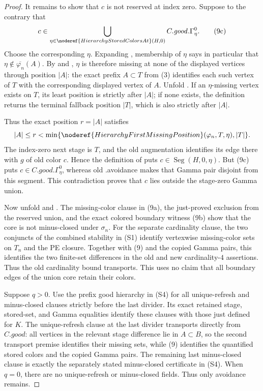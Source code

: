 \begin{proof}
It remains to show that \(c\) is not reserved at index zero.  Suppose to
the contrary that
\[
 c\in\bigcup_{\eta\in\noderef{HierarchyStoredColorsAt}(H,0)}
                  C.\mathit{good}.\Gamma^0_\eta .              \tag{9c}
\]
Choose the corresponding \(\eta\).  Expanding
, membership of \(\eta\) says in
particular that \(\eta\notin\overline{\varphi_n}(A)\).  By
 and , \(\eta\)
is therefore missing at none of the displayed vertices through position
\(|A|\): the exact prefix \(A\subset T\) from (3) identifies each such
vertex of \(T\) with the corresponding displayed vertex of \(A\).  Unfold
.  If an
\(\eta\)-missing vertex exists on \(T\), its least position is strictly
after \(|A|\); if none exists, the definition returns the terminal
fallback position \(|T|\), which is also strictly after \(|A|\).

Thus the exact position \(r=|A|\) satisfies
\[
 |A|\le r<\min\{
 \noderef{HierarchyFirstMissingPosition}(\varphi_n,T,\eta),|T|\}.
\]
The index-zero next stage is \(T\), and the old augmentation identifies
its edge there with \(g\) of old color \(c\).  Hence the definition of
 puts
\(c\in\operatorname{Seg}(H,0,\eta)\).  But (9c) puts
\(c\in C.\mathit{good}.\Gamma^0_\eta\), whereas old
.avoidance makes that Gamma pair disjoint from
this segment.  This contradiction proves that \(c\) lies outside the
stage-zero Gamma union.

Now unfold  and
.  The missing-color clause in (9a), the
just-proved exclusion from the reserved union, and the exact colored
boundary witness (9b) show that the core is not minus-closed under
\(\sigma_n\).  For the separate cardinality clause, the two
 conjuncts of the combined stability in (S1)
identify vertexwise missing-color sets on \(T_n\) and the PE closure.
Together with (9) and the copied Gamma pairs, this identifies the two
finite-set differences in the old and new cardinality-\(4\) assertions.
Thus the old cardinality bound transports.  This uses no claim that all
boundary edges of the union core retain their colors.

Suppose \(q>0\).  Use the prefix good hierarchy in (S4) for all
unique-refresh and minus-closed clauses strictly before the last divider.
Its exact retained stage, stored-set, and Gamma equalities identify these
clauses with those just defined for \(K\).  The unique-refresh clause at
the last divider transports directly from \(C.\mathit{good}\): all vertices
in the relevant stage difference lie in \(A\subset B\), so the second
transport premise identifies their missing sets, while (9) identifies the
quantified stored colors and the copied Gamma pairs.  The remaining last
minus-closed clause is exactly the separately stated minus-closed
certificate in (S4).  When \(q=0\), there are no unique-refresh or
minus-closed fields.  Thus only avoidance remains.


\end{proof}
